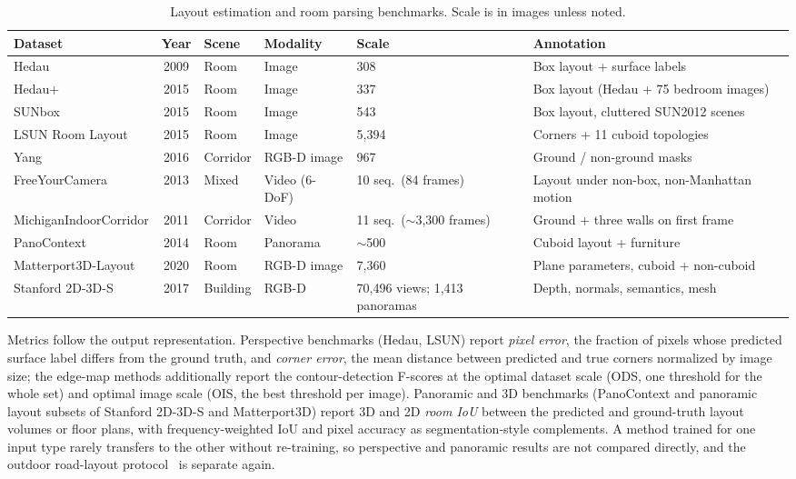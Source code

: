 \begin{table}[!t]
    \centering
    \caption{Layout estimation and room parsing benchmarks. Scale is in images unless noted.}
    \label{tab:layout_estimation_room_parsing_dataset}
    \fontsize{9}{11}\selectfont
    \setlength{\tabcolsep}{2.0mm}
    \begin{tabular}{L{0.20\textwidth} c C{0.08\textwidth} C{0.11\textwidth} C{0.12\textwidth} L{0.27\textwidth}}
    \toprule
    \textbf{Dataset} & \textbf{Year} & \textbf{Scene} & \textbf{Modality} & \textbf{Scale} & \textbf{Annotation} \\
    \midrule
    Hedau \cite{HedauHF09} & 2009 & Room & Image & 308 & Box layout + surface labels \\
    Hedau+ \cite{MallyaL15} & 2015 & Room & Image & 337 & Box layout (Hedau + 75 bedroom images) \\
    SUNbox \cite{MallyaL15} & 2015 & Room & Image & 543 & Box layout, cluttered SUN2012 scenes \\
    LSUN Room Layout \cite{yu2015lsun} & 2015 & Room & Image & 5,394 & Corners + 11 cuboid topologies \\
    Yang \cite{YangMS16} & 2016 & Corridor & RGB-D image & 967 & Ground / non-ground masks \\
    FreeYourCamera \cite{FurlanMSLS13} & 2013 & Mixed & Video (6-DoF) & 10 seq.\ (84 frames) & Layout under non-box, non-Manhattan motion \\
    MichiganIndoorCorridor \cite{TsaiXLK11} & 2011 & Corridor & Video & 11 seq.\ ($\sim$3,300 frames) & Ground + three walls on first frame \\
    PanoContext \cite{zhang2014panocontext} & 2014 & Room & Panorama & $\sim$500 & Cuboid layout + furniture \\
    Matterport3D-Layout \cite{0005ZZ20} & 2020 & Room & RGB-D image & 7,360 & Plane parameters, cuboid + non-cuboid \\
    Stanford 2D-3D-S \cite{armeni2017joint} & 2017 & Building & RGB-D & 70,496 views; 1,413 panoramas & Depth, normals, semantics, mesh \\
    \bottomrule
    \end{tabular}
\end{table}

Metrics follow the output representation. Perspective benchmarks (Hedau, LSUN) report \emph{pixel error}, the fraction of pixels whose predicted surface label differs from the ground truth, and \emph{corner error}, the mean distance between predicted and true corners normalized by image size; the edge-map methods additionally report the contour-detection F-scores at the optimal dataset scale (ODS, one threshold for the whole set) and optimal image scale (OIS, the best threshold per image). Panoramic and 3D benchmarks (PanoContext and panoramic layout subsets of Stanford 2D-3D-S and Matterport3D) report 3D and 2D \emph{room IoU} between the predicted and ground-truth layout volumes or floor plans, with frequency-weighted IoU and pixel accuracy as segmentation-style complements. A method trained for one input type rarely transfers to the other without re-training, so perspective and panoramic results are not compared directly, and the outdoor road-layout protocol~\cite{YangLLYMHP21} is separate again.

